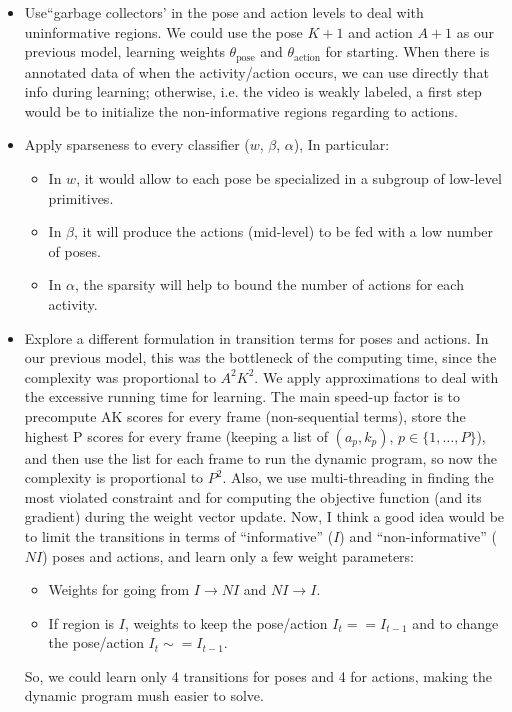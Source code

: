 \documentclass[10pt,letterpaper]{article}
\newcommand{\+}[1]{\ensuremath{{\boldsymbol #1}}}
\begin{document}
\begin{itemize}
\item Use``garbage collectors' in the pose and action levels to deal with uninformative regions. We could use the pose $K+1$ and action $A+1$ as our previous model, learning weights $\theta_{\text{pose}}$ and $\theta_{\text{action}}$ for starting. When there is annotated data of when the activity/action occurs, we can use directly that info during learning; otherwise, i.e. the video is weakly labeled, a first step would be to initialize the non-informative regions regarding to actions. 
\item Apply sparseness to every classifier ($w$, $\beta$, $\alpha$), In particular:
\begin{itemize}
\item In $w$, it would allow to each pose be specialized in a subgroup of low-level primitives.
\item In $\beta$, it will produce the actions (mid-level) to be fed with a low number of poses. 
\item In $\alpha$, the sparsity will help to bound the number of actions for each activity.
\end{itemize}
\item Explore a different formulation in transition terms for poses and actions. In our previous model, this was the bottleneck  of the computing time, since the complexity was proportional to $A^2K^2$. We apply approximations to deal with the excessive running time for learning. The main speed-up factor is to precompute AK scores for every frame (non-sequential terms), store the highest P scores for every frame (keeping a list of $(a_p,k_p)$, $p \in \{1,\dots,P\}$), and then use the list for each frame to run the dynamic program, so now the complexity is proportional to $P^2$. Also, we use multi-threading in finding the most violated constraint and for computing the objective function (and its gradient) during the weight vector update. Now, I think a good idea would be to limit the transitions in terms of ``informative'' ($I$) and ``non-informative'' ($NI$) poses and actions, and learn only a few weight parameters:
\begin{itemize}
\item Weights for going from $I \rightarrow NI$ and $NI \rightarrow I$.
\item If region is $I$, weights to keep the pose/action $I_t == I_{t-1}$ and to change the pose/action $I_t \sim= I_{t-1}$.
\end{itemize} 
So, we could learn only 4 transitions for poses and 4 for actions, making the dynamic program mush easier to solve. 

\end{itemize}
\end{document}
